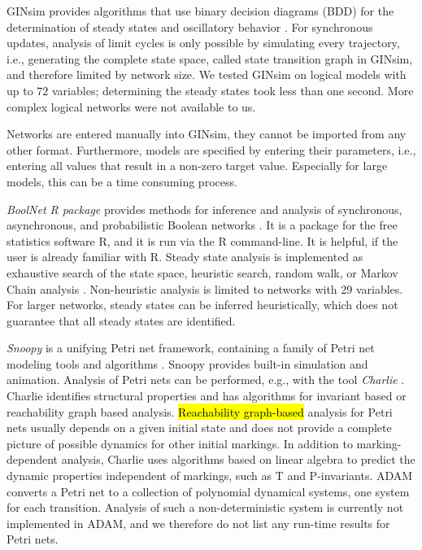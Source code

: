 \documentclass[10pt]{bmc_article}
\newenvironment{bmcformat}{\begin{raggedright}\baselineskip20pt\sloppy\setboolean{publ}{false}}{\end{raggedright}\baselineskip20pt\sloppy}
\begin{document}
\begin{bmcformat}
GINsim
provides algorithms that use binary decision diagrams (BDD) for the
determination of steady states and oscillatory behavior \cite{Chaouiya}. 
For
synchronous updates, analysis of limit cycles is only possible by simulating every trajectory, i.e., generating the complete state space, called state transition graph in GINsim,
and therefore limited by network size.
We tested GINsim on logical models with up to $72$ variables; determining the
steady states took less than one second. More complex logical networks were not available to us.

Networks are entered
manually into GINsim, they cannot be imported from any other format.
Furthermore, models are specified by entering their parameters, i.e., entering
all values that result in a non-zero target value. Especially for large models, this can be a time consuming process. 


{\it BoolNet R package} provides methods for inference and analysis of synchronous,
asynchronous, and probabilistic Boolean networks \cite{boolnet}. It is a
package for the free statistics software R, and it is run via the R command-line. It is helpful, if the user is already familiar with R. 
Steady state
analysis is implemented as exhaustive search of the state space, heuristic
search, random walk, or Markov Chain analysis \cite{shmulevich}. Non-heuristic analysis is limited to networks with 29 variables.
For
larger networks, steady states can be inferred heuristically, which does not guarantee that all steady states are identified. 


{\it Snoopy} is a unifying Petri net framework, containing a family of Petri
net modeling tools and algorithms \cite{Snoopy}. Snoopy provides built-in simulation
and animation. Analysis of Petri nets can be performed, e.g., with the
tool {\it Charlie} \cite{Charlie}. Charlie identifies structural properties and
has algorithms for invariant based or reachability graph based analysis. \hl{Reachability graph-based} analysis for Petri nets usually depends on a given initial state and does not provide a complete picture of possible dynamics for other initial markings. In addition to marking-dependent analysis, Charlie uses algorithms based on linear algebra to predict the dynamic properties independent of markings, such as T and P-invariants. ADAM converts a Petri net to a collection of polynomial dynamical systems, one system for each transition. Analysis of such a non-deterministic system is currently not implemented in ADAM, and we therefore do not list any run-time results for Petri nets. 


\end{bmcformat}
\end{document}
